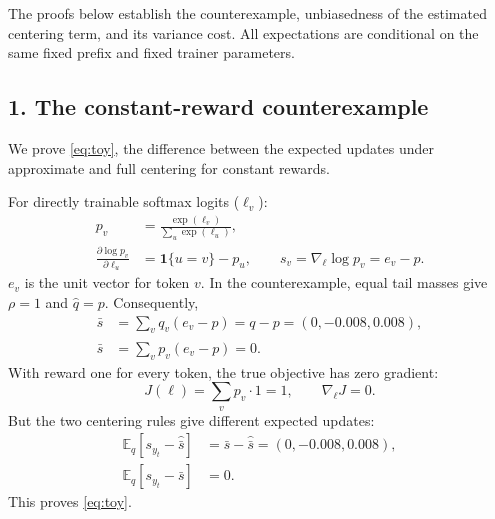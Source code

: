 \documentclass[10pt]{article}
\newcommand{\E}{\mathbb{E}}
\begin{document}
The proofs below establish the counterexample, unbiasedness of the estimated centering term, and its variance cost. All expectations are conditional on the same fixed prefix and fixed trainer parameters.

\subsection*{1. The constant-reward counterexample}
\label{app:toy}
We prove \eqref{eq:toy}, the difference between the expected updates under approximate and full centering for constant rewards.

For directly trainable softmax logits ($\ell_v$):
\begin{equation}
\begin{aligned}
 p_v&=\frac{\exp(\ell_v)}{\sum_u\exp(\ell_u)},\\
 \frac{\partial\log p_v}{\partial\ell_u}
 &=\mathbf 1\{u=v\}-p_u,
 \qquad s_v=\nabla_\ell\log p_v=e_v-p.
\end{aligned}
\end{equation}
$e_v$ is the unit vector for token $v$. In the counterexample, equal tail masses give $\rho=1$ and $\widehat q=p$. Consequently,
\begin{equation}
\begin{aligned}
 \bar s&=\sum_vq_v(e_v-p)=q-p=(0,-0.008,0.008),\\
 \widehat{\bar s}&=\sum_vp_v(e_v-p)=0.
\end{aligned}
\end{equation}
With reward one for every token, the true objective has zero gradient:
\begin{equation}
 J(\ell)=\sum_vp_v\cdot 1=1,\qquad \nabla_\ell J=0.
\end{equation}
But the two centering rules give different expected updates:
\begin{equation}
\begin{aligned}
 \E_q[s_{y_t}-\widehat{\bar s}]
 &=\bar s-\widehat{\bar s}=(0,-0.008,0.008),\\
 \E_q[s_{y_t}-\bar s]&=0.
\end{aligned}
\end{equation}
This proves \eqref{eq:toy}.
\end{document}
